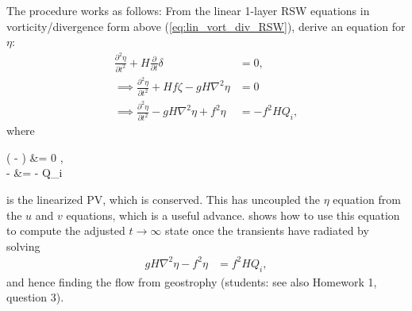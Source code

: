 \documentclass[10pt,reqno]{amsart}
\begin{document}
The procedure works as follows:
From the linear 1-layer RSW equations in vorticity/divergence form above (\ref{eq:lin_vort_div_RSW}), derive an equation for $\eta$:
\begin{align}
\frac{\partial^2 \eta}{\partial t^2 }  + H \frac{\partial}{\partial t} \delta &= 0   , \\
\implies \frac{\partial^2 \eta}{\partial t^2 } + H f \zeta - g H \nabla^2 \eta &= 0   \label{eqn:intermediate_eta} \\
\implies \frac{\partial^2 \eta}{\partial t^2 } - g H \nabla^2 \eta  + f^2 \eta&= - f^2 H Q_i    ,
\end{align}
where
\begin{mymathbox}[ams align, title=Linear PV conservation, colframe=black!30!black]
 \left(  - \right) &= 0 , \nonumber  \\
\implies {} -  &=  -  \equiv Q_i   
\label{eqn:initial_PV}
\end{mymathbox}
is the linearized PV, which is conserved.
This has uncoupled the $\eta$ equation from the $u$ and $v$ equations, which is a useful advance.
\citet{gill82} shows how to use this equation to compute the adjusted $t \rightarrow \infty$ state once the transients have radiated by solving
\begin{align}
g H \nabla^2 \eta  - f^2 \eta&= f^2 H Q_i    ,
\end{align}
and hence finding the flow from geostrophy (students: see also Homework 1, question 3).
\end{document}

